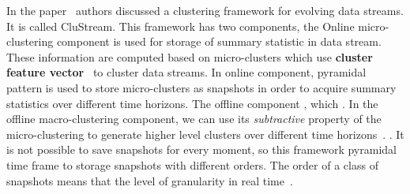 In the paper~\cite{aggarwal2003framework} authors discussed a clustering framework
for evolving data streams. It is called CluStream. This framework
has two components, the Online micro-clustering component is used for storage
of summary statistic in data stream. These information are computed based on
micro-clusters which use \textbf{cluster feature vector}~\cite{zhang1996birch}
to cluster data streams. In online component, pyramidal pattern is used to
store micro-clusters as snapshots in order to acquire summary statistics over
different time horizons. The offline component , which
 . In the offline
macro-clustering component, we can use its \emph{subtractive} property of
the micro-clustering to generate higher level clusters over different time
horizons~\cite{aggarwal2003framework}. . It is not
possible to save snapshots for every moment, so this framework  pyramidal
time frame to storage snapshots with different orders. The order of a class of
snapshots means that the level of granularity in real
time~\cite{aggarwal2003framework}.
